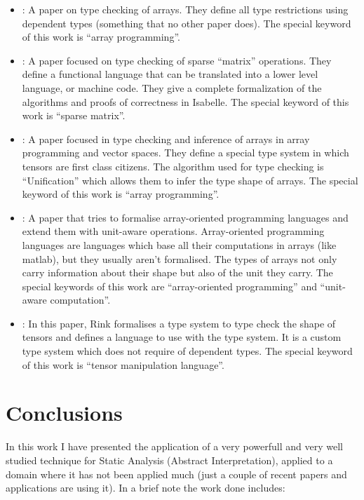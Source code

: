 \documentclass[
11pt, %
english, %
singlespacing, %
headsepline, %
]{MastersDoctoralThesis} %
\begin{document}
\begin{itemize}
\item
  \textcite{trojahner_dependently_2009}: A paper on type checking of
  arrays. They define all type restrictions using dependent types
  (something that no other paper does). The special keyword of this work
  is \enquote{array programming}.
\item
  \textcite{arnold_specifying_2010}: A paper focused on type checking of
  sparse \enquote{matrix} operations. They define a functional language
  that can be translated into a lower level language, or machine code.
  They give a complete formalization of the algorithms and proofs of
  correctness in Isabelle. The special keyword of this work is
  \enquote{sparse matrix}.
\item
  \textcite{griffioen_type_2015}: A paper focused in type checking and
  inference of arrays in array programming and vector spaces. They
  define a special type system in which tensors are first class
  citizens. The algorithm used for type checking is
  \enquote{Unification} which allows them to infer the type shape of
  arrays. The special keyword of this work is \enquote{array
  programming}.
\item
  \textcite{slepak_array-oriented_2014}: A paper that tries to formalise
  array-oriented programming languages and extend them with unit-aware
  operations. Array-oriented programming languages are languages which
  base all their computations in arrays (like matlab), but they usually
  aren't formalised. The types of arrays not only carry information
  about their shape but also of the unit they carry. The special
  keywords of this work are \enquote{array-oriented programming} and
  \enquote{unit-aware computation}.
\item
  \textcite{rink_modeling_2018}: In this paper, Rink formalises a type
  system to type check the shape of tensors and defines a language to
  use with the type system. It is a custom type system which does not
  require of dependent types. The special keyword of this work is
  \enquote{tensor manipulation language}.
\end{itemize}

\hypertarget{conclusions}{%
\chapter{Conclusions}\label{conclusions}}

{}

In this work I have presented the application of a very powerfull and
very well studied technique for Static Analysis (Abstract
Interpretation), applied to a domain where it has not been applied much
(just a couple of recent papers and applications are using it). In a
brief note the work done includes:
\end{document}
